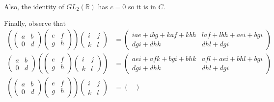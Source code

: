 \documentclass[12pt]{article}
\newcommand{\R}{\mathbb{R}}
\begin{document}
\begin{enumerate}[label=(\alph*)]
    Also, the identity of $GL_2(\R)$ has $c = 0$ so it is in $C$.

    Finally, observe that 
    \begin{align*}
        \left(\begin{pmatrix}
            a & b\\
            0 & d
        \end{pmatrix}\begin{pmatrix}
            e & f\\
            g & h
        \end{pmatrix}\right) \begin{pmatrix}
            i & j\\
            k & l
        \end{pmatrix} &= \begin{pmatrix}
            iae + ibg + kaf + kbh & laf+lbh + aei + bgi\\
            dgi + dhk & dhl + dgi
        \end{pmatrix}\\
        \begin{pmatrix}
            a & b\\
            0 & d
        \end{pmatrix}\left(\begin{pmatrix}
            e & f\\
            g & h
        \end{pmatrix} \begin{pmatrix}
            i & j\\
            k & l
        \end{pmatrix} \right) &= \begin{pmatrix}
            aei + afk + bgi + bhk & afl + aei + bhl + bgi\\
            dgi+ dhk & dhl + dgi
        \end{pmatrix}\\
        \left(\begin{pmatrix}
            a & b\\
            0 & d
        \end{pmatrix}\begin{pmatrix}
            e & f\\
            g & h
        \end{pmatrix}\right) \begin{pmatrix}
            i & j\\
            k & l
        \end{pmatrix} &= \begin{pmatrix}

\end{pmatrix}
\end{align*}
\end{enumerate}
\end{document}
